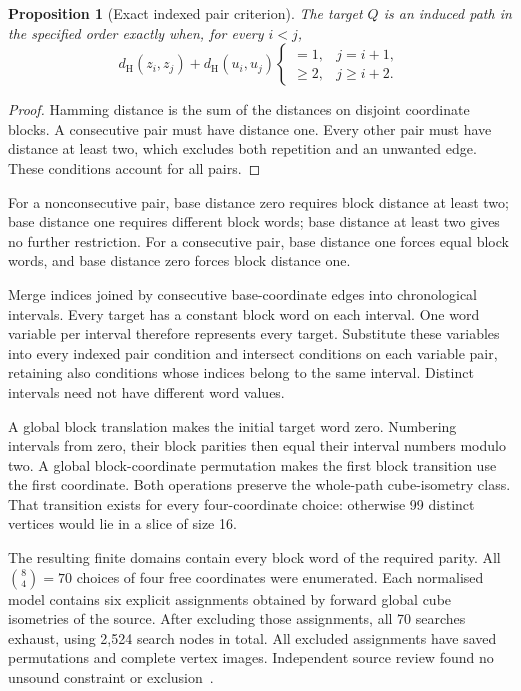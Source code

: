 \documentclass[11pt,a4paper]{article}
\newtheorem{proposition}[theorem]{Proposition}
\theoremstyle{definition}
\theoremstyle{remark}
\newcommand{\Ham}{d_{\mathrm H}}
\begin{document}
\begin{proposition}[Exact indexed pair criterion]
The target $Q$ is an induced path in the specified order exactly
when, for every $i<j$,
\[
\Ham(z_i,z_j)+\Ham(u_i,u_j)
\begin{cases}
=1,&j=i+1,\\
\ge2,&j\ge i+2.
\end{cases}
\]
\end{proposition}
\begin{proof}
Hamming distance is the sum of the distances on disjoint coordinate
blocks. A consecutive pair must have distance one. Every other pair
must have distance at least two, which excludes both repetition and
an unwanted edge. These conditions account for all pairs.
\end{proof}

For a nonconsecutive pair, base distance zero requires block
distance at least two; base distance one requires different block
words; base distance at least two gives no further restriction.
For a consecutive pair, base distance one forces equal block words,
and base distance zero forces block distance one.

Merge indices joined by consecutive base-coordinate edges into
chronological intervals. Every target has a constant block word on
each interval. One word variable per interval therefore represents
every target. Substitute these variables into every indexed pair
condition and intersect conditions on each variable pair, retaining
also conditions whose indices belong to the same interval. Distinct
intervals need not have different word values.

A global block translation makes the initial target word zero.
Numbering intervals from zero, their block parities then equal
their interval numbers modulo two. A global block-coordinate
permutation makes the first block transition use the first coordinate.
Both operations preserve the whole-path cube-isometry class.
That transition exists for every four-coordinate choice: otherwise
99 distinct vertices would lie in a slice of size 16.

The resulting finite domains contain every block word of the
required parity. All $\binom84=70$ choices of four free coordinates
were enumerated. Each normalised model contains six explicit
assignments obtained by forward global cube isometries of the source.
After excluding those assignments, all 70 searches exhaust, using
2,524 search nodes in total. All excluded assignments have saved
permutations and complete vertex images. Independent source review
found no unsound constraint or exclusion~\cite{research206}.
\end{document}
